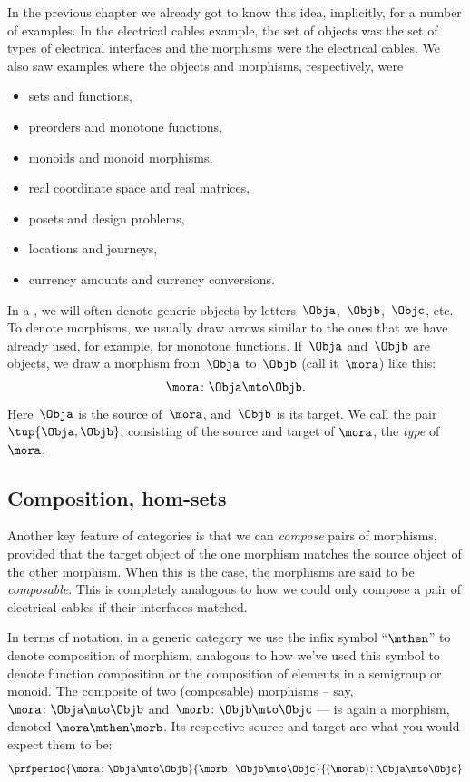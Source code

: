 In the previous chapter we already got to know this idea, implicitly, for a number of examples. In the electrical cables example, the set of objects was the set of types of electrical interfaces and the morphisms were the electrical cables. We also saw examples where the objects and morphisms, respectively, were
\begin{itemize}
\item sets and functions,
\item preorders and monotone functions,
\item monoids and monoid morphisms, 
\item real coordinate space and real matrices,
\item posets and design problems,
\item locations and journeys,
\item currency amounts and currency conversions.
\end{itemize}


In a , we will often denote generic objects by letters~$\Obja$,~$\Objb$,~$\Objc$, etc. To denote morphisms, we usually draw arrows similar to the ones that we have already used, for example, for monotone functions. If~$\Obja$ and~$\Objb$ are objects, we draw a morphism from~$\Obja$ to~$\Objb$ (call it~$\mora$) like this:
\begin{equation}
    \mora\colon \Obja \mto \Objb.
\end{equation}
Here~$\Obja$ is the source of~$\mora$, and~$\Objb$ is its target. We call the pair $\tup{\Obja, \Objb}$,  consisting of the source and target of $\mora$, the \emph{type} of $\mora$. 

\subsection{Composition, hom-sets}

Another key feature of categories is that we can \emph{compose} pairs of morphisms, provided that the target object of the one morphism matches the source object of the other morphism. When this is the case, the morphisms are said to be \emph{composable}. This is completely analogous to how we could only compose a pair of electrical cables if their interfaces matched. 

In terms of notation, in a generic category we use the infix symbol ``$\mthen$'' to denote composition of morphism, analogous to how we've used this symbol to denote function composition or the composition of elements in a semigroup or monoid. The composite of two (composable) morphisms -- say, $\mora\colon \Obja \mto \Objb$ and~$\morb\colon \Objb \mto \Objc$ --- is again a morphism, denoted $\mora \mthen \morb$. Its respective source and target are what you would expect them to be: 
\begin{equation}\label{eq:generic-cat-comp-rule}
    \prfperiod{
        \mora \colon \Obja \mto \Objb
    }{
        \morb\colon \Objb \mto \Objc
    }{
        (\morab )\colon \Obja \mto \Objc
    }
\end{equation}

